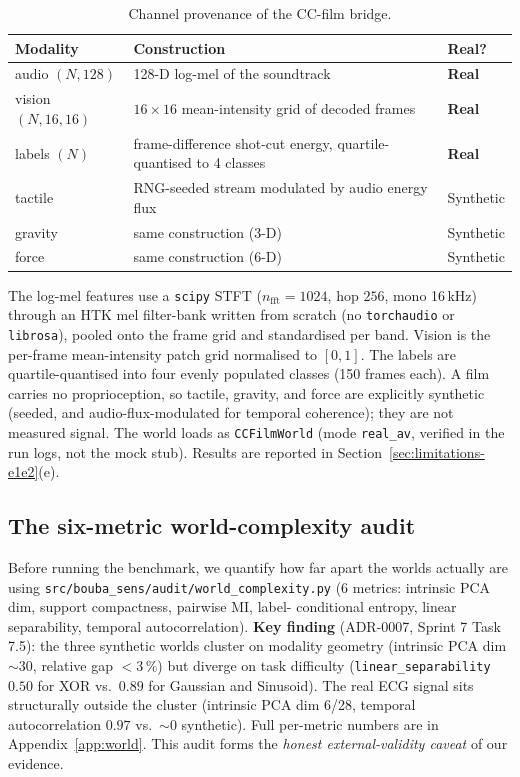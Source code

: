 \documentclass{article}
\begin{document}
\begin{table}[ht]
  \centering
  \caption{Channel provenance of the CC-film bridge.}
  \label{tab:ccfilm-provenance}
  \begin{tabular}{lll}
    \toprule
    Modality & Construction & Real? \\
    \midrule
    audio $(N,128)$ & 128-D log-mel of the soundtrack & \textbf{Real} \\
    vision $(N,16,16)$ & $16\times 16$ mean-intensity grid of decoded frames & \textbf{Real} \\
    labels $(N)$ & frame-difference shot-cut energy, quartile-quantised to 4 classes & \textbf{Real} \\
    tactile & RNG-seeded stream modulated by audio energy flux & Synthetic \\
    gravity & same construction (3-D) & Synthetic \\
    force & same construction (6-D) & Synthetic \\
    \bottomrule
  \end{tabular}
\end{table}

The log-mel features use a \texttt{scipy} STFT ($n_{\mathrm{fft}} =
1024$, hop $256$, mono 16\,kHz) through an HTK mel filter-bank
written from scratch (no \texttt{torchaudio} or \texttt{librosa}),
pooled onto the frame grid and standardised per band. Vision is the
per-frame mean-intensity patch grid normalised to $[0,1]$. The
labels are quartile-quantised into four evenly populated classes
(150 frames each). A film carries no proprioception, so
tactile, gravity, and force are explicitly synthetic (seeded, and
audio-flux-modulated for temporal coherence); they are not measured
signal. The world loads as \texttt{CCFilmWorld} (mode
\texttt{real\_av}, verified in the run logs, not the mock stub).
Results are reported in Section~\ref{sec:limitations-e1e2}(e).

\subsection{The six-metric world-complexity audit}
\label{sec:audit}

Before running the benchmark, we quantify how far apart the
worlds actually are using
\texttt{src/bouba\_sens/audit/world\_complexity.py} (6 metrics:
intrinsic PCA dim, support compactness, pairwise MI, label-
conditional entropy, linear separability, temporal
autocorrelation). \textbf{Key finding} (ADR-0007, Sprint 7
Task 7.5): the three synthetic worlds cluster on modality
geometry (intrinsic PCA dim $\sim 30$, relative gap $< 3\,\%$)
but diverge on task difficulty
(\texttt{linear\_separability} $0.50$ for XOR vs.\ $0.89$ for
Gaussian and Sinusoid). The real ECG signal sits structurally
outside the cluster (intrinsic PCA dim 6/28, temporal
autocorrelation $0.97$ vs.\ $\sim 0$ synthetic). Full per-metric
numbers are in Appendix~\ref{app:world}. This audit forms the
\emph{honest external-validity caveat} of our evidence.
\end{document}
